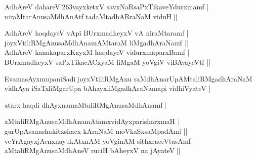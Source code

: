 \begin{entry}
\begin{shl}
AdhAreV dahareV{\char'263}vayxketxV savxNaRsaPxTikaveYdurxmamf |\\
niraMtarAnusaMdhAnAtf tadaMtadhARraNaM viduH ||
\end{shl}
\begin{shl}
AdhAreV haqdayeV vApi BUrxmadheyxV vA niraMtaramf |\\
joyxVtiliRMgAnusaMdhAnamAMtaraM liMgadhAraNamf ||\\
AdhAreV kanakaparxKayxM haqdayeV vidurxmaparxBamf |\\
BUrxmadheyxV saPxTikacACxyaM liMgaM yoVgiV viBAvayeVtf ||
\end{shl}
\begin{shl}
EvamasAyxmupaniSadi joyxVtiliRMgAnu saMdhAnarUpAMtaliRMgadhAraNaM vidhAya
iSaTxliMgarUpa bAhayxliMgadhAraNamapi vidhiVyateV |
\end{shl}
\end{entry}

\begin{entry}
\begin{shl}
atarx haqdi dhAyxnamaMtaliRMgAnusaMdhAnamf |
\end{shl}
\begin{shl}
aMtaliRMgAnusaMdhAnamAtamxvidAyxparisharxmaH |\\
gurUpAsanashakitxshacx kAraNaM moVkaSxsaMpadAmf ||\\
veYrAgayxjAcnxnayukAtxnAM yoVginAM sithxraceVtasAmf |\\
aMtaliRMgAnusaMdhAneV ruciH bAheyxV na jAyateV ||
\end{shl}
\end{entry}

